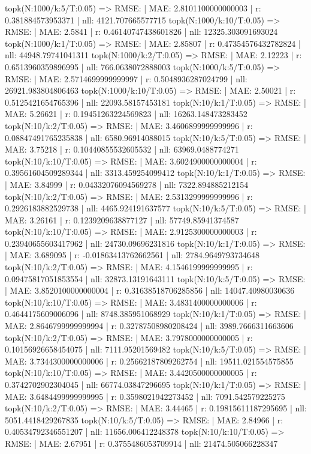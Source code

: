 topk(N:1000/k:5/T:0.05) => RMSE: | MAE: 2.8101100000000003 | r: 0.381884573953371 | nll: 4121.707665577715
topk(N:1000/k:10/T:0.05) => RMSE: | MAE: 2.5841 | r: 0.46140747438601826 | nll: 12325.303091693024
topk(N:1000/k:1/T:0.05) => RMSE: | MAE: 2.85807 | r: 0.47354576432782824 | nll: 44948.79741041311
topk(N:1000/k:2/T:0.05) => RMSE: | MAE: 2.12223 | r: 0.6513960359896995 | nll: 766.0638072888003
topk(N:1000/k:5/T:0.05) => RMSE: | MAE: 2.5714699999999997 | r: 0.5048936287024799 | nll: 26921.983804806463
topk(N:1000/k:10/T:0.05) => RMSE: | MAE: 2.50021 | r: 0.5125421654765396 | nll: 22093.58157453181
topk(N:10/k:1/T:0.05) => RMSE: | MAE: 5.26621 | r: 0.19451263224569823 | nll: 16263.148473283452
topk(N:10/k:2/T:0.05) => RMSE: | MAE: 3.4606899999999996 | r: 0.08847491765235838 | nll: 6580.96914088015
topk(N:10/k:5/T:0.05) => RMSE: | MAE: 3.75218 | r: 0.10440855532605532 | nll: 63969.0488774271
topk(N:10/k:10/T:0.05) => RMSE: | MAE: 3.6024900000000004 | r: 0.39561604509289344 | nll: 3313.459254099412
topk(N:10/k:1/T:0.05) => RMSE: | MAE: 3.84999 | r: 0.04332076094569278 | nll: 7322.894885212154
topk(N:10/k:2/T:0.05) => RMSE: | MAE: 2.5313299999999996 | r: 0.2926183882529738 | nll: 4465.924191637577
topk(N:10/k:5/T:0.05) => RMSE: | MAE: 3.26161 | r: 0.1239209638877127 | nll: 57749.85941374587
topk(N:10/k:10/T:0.05) => RMSE: | MAE: 2.9125300000000003 | r: 0.23940655603417962 | nll: 24730.09696231816
topk(N:10/k:1/T:0.05) => RMSE: | MAE: 3.689095 | r: -0.01863413762662561 | nll: 2784.9649793734648
topk(N:10/k:2/T:0.05) => RMSE: | MAE: 4.1546199999999995 | r: 0.09475817051853554 | nll: 32873.13191643111
topk(N:10/k:5/T:0.05) => RMSE: | MAE: 3.8520100000000004 | r: 0.31638518706285856 | nll: 14047.40980030636
topk(N:10/k:10/T:0.05) => RMSE: | MAE: 3.4831400000000006 | r: 0.4644175609006096 | nll: 8748.385951068929
topk(N:10/k:1/T:0.05) => RMSE: | MAE: 2.8646799999999994 | r: 0.32787508980208424 | nll: 3989.7666311663606
topk(N:10/k:2/T:0.05) => RMSE: | MAE: 3.7978000000000005 | r: 0.10156926658454075 | nll: 7111.95201569482
topk(N:10/k:5/T:0.05) => RMSE: | MAE: 3.7344300000000006 | r: 0.25662187809262754 | nll: 19511.021554575855
topk(N:10/k:10/T:0.05) => RMSE: | MAE: 3.4420500000000005 | r: 0.3742702902304045 | nll: 66774.03847296695
topk(N:10/k:1/T:0.05) => RMSE: | MAE: 3.6484499999999995 | r: 0.3598021942273452 | nll: 7091.542579225275
topk(N:10/k:2/T:0.05) => RMSE: | MAE: 3.44465 | r: 0.19815611187295695 | nll: 5051.4418429267835
topk(N:10/k:5/T:0.05) => RMSE: | MAE: 2.84966 | r: 0.40534792346551207 | nll: 11656.006412248378
topk(N:10/k:10/T:0.05) => RMSE: | MAE: 2.67951 | r: 0.3755486053709914 | nll: 21474.505066228347

